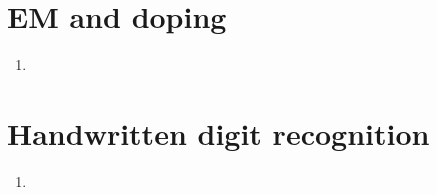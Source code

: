 \documentclass[a4paper,10pt]{article}
\numberwithin{equation}{section} %
\numberwithin{figure}{section} %
\numberwithin{table}{section} %
\theoremstyle{mytheor}
\begin{document}

\section{EM and doping}
\begin{enumerate}
	\item 
\end{enumerate}


\section{Handwritten digit recognition}
\begin{enumerate}
	\item
\end{enumerate}
\end{document}

